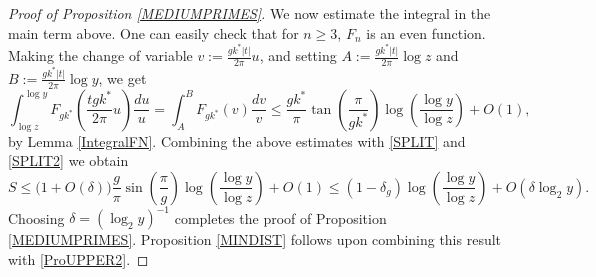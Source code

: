 \documentclass[12pt]{amsart}
\theoremstyle{definition}
\numberwithin{equation}{section}
\begin{document}
\begin{proof}[Proof of Proposition \ref{MEDIUMPRIMES}]
We now estimate the integral in the main term above. One can easily check that for $n\geq 3$, $F_n$ is an even function. Making the change of variable $v := \frac{gk^{\ast}|t|}{2\pi} u$, and setting $A := \frac{gk^{\ast}|t|}{2\pi} \log z$ and $B := \frac{gk^{\ast}|t|}{2\pi} \log y$, we get
\begin{equation*}
\int_{\log z}^{\log y} F_{gk^{\ast}}\left(\frac{t gk^{\ast}}{2\pi} u\right)\frac{du}{u} = \int_A^B F_{gk^{\ast}}(v) \frac{dv}{v}\leq \frac{gk^{\ast}}{\pi} \tan\left(\frac{\pi}{gk^{\ast}}\right)\log\left(\frac{\log y}{\log z}\right)+ O(1),
\end{equation*}
by Lemma \ref{IntegralFN}. Combining the above estimates with \eqref{SPLIT} and \eqref{SPLIT2} we obtain
$$ S\leq \big(1+O(\delta)\big) \frac{g}{\pi} \sin\left(\frac{\pi}{g}\right)\log\left(\frac{\log y}{\log z}\right)+ O(1)\leq (1-\delta_g)\log\left(\frac{\log y}{\log z}\right)+O(\delta\log_2 y).$$
Choosing $\delta=(\log_2y)^{-1}$ completes the proof of Proposition \ref{MEDIUMPRIMES}. Proposition \ref{MINDIST} follows upon combining this result with \eqref{ProUPPER2}.
\end{proof}
\end{document}
